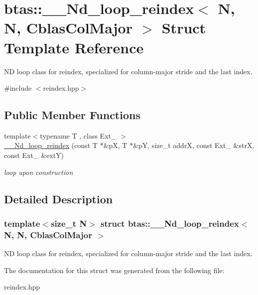 \hypertarget{structbtas_1_1_____nd__loop__reindex_3_01_n_00_01_n_00_01_cblas_col_major_01_4}{
\section{btas::\_\-\_\-Nd\_\-loop\_\-reindex$<$ N, N, CblasColMajor $>$ Struct Template Reference}
\label{structbtas_1_1_____nd__loop__reindex_3_01_n_00_01_n_00_01_cblas_col_major_01_4}
}


ND loop class for reindex, specialized for column-\/major stride and the last index.  


{\ttfamily \#include $<$reindex.hpp$>$}\subsection*{Public Member Functions}
\begin{DoxyCompactItemize}
\item 
\hypertarget{structbtas_1_1_____nd__loop__reindex_3_01_n_00_01_n_00_01_cblas_col_major_01_4_aee19ac8b4cedfec88d58421486086601}{
{\footnotesize template$<$typename T , class Ext\_\- $>$ }\\\hyperlink{structbtas_1_1_____nd__loop__reindex_3_01_n_00_01_n_00_01_cblas_col_major_01_4_aee19ac8b4cedfec88d58421486086601}{\_\-\_\-Nd\_\-loop\_\-reindex} (const T $\ast$\&pX, T $\ast$\&pY, size\_\-t addrX, const Ext\_\- \&strX, const Ext\_\- \&extY)}
\label{structbtas_1_1_____nd__loop__reindex_3_01_n_00_01_n_00_01_cblas_col_major_01_4_aee19ac8b4cedfec88d58421486086601}

\begin{DoxyCompactList}\small\item\em loop upon construction \item\end{DoxyCompactList}\end{DoxyCompactItemize}


\subsection{Detailed Description}
\subsubsection*{template$<$size\_\-t N$>$ struct btas::\_\-\_\-Nd\_\-loop\_\-reindex$<$ N, N, CblasColMajor $>$}

ND loop class for reindex, specialized for column-\/major stride and the last index. 

The documentation for this struct was generated from the following file:\begin{DoxyCompactItemize}
\item 
reindex.hpp\end{DoxyCompactItemize}
